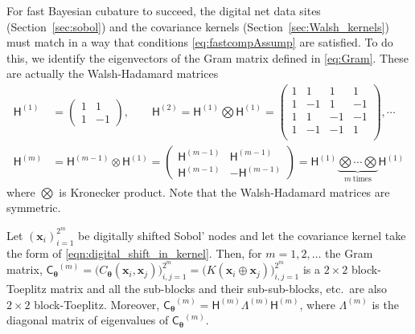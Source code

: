 \documentclass[graybox,footinfo]{svmult}
\newcommand{\bm}[1]{\boldsymbol{#1}}
\newcommand{\vtheta}{{\bm{\theta}}}
\newcommand{\vx}{\bm{x}}
\newcommand{\ai}{\overrightarrow{\imath}}
\newcommand{\aj}{\overrightarrow{\jmath}}
\newcommand{\mCtheta}{{\mathsf{C}_{\vtheta}}}
\newcommand{\mLambda}{\mathsf{\Lambda}}
\newcommand{\mH}{\mathsf{H}}
\newcommand\secref{Section~\ref}
\begin{document}
For fast Bayesian cubature to succeed, the digital net data sites (\secref{sec:sobol}) and the covariance kernels (\secref{sec:Walsh_kernels}) must match in a way that conditions \eqref{eq:fastcompAssump} are satisfied.  To do this, we identify the eigenvectors of the Gram matrix defined in \eqref{eq:Gram}.  These are actually the Walsh-Hadamard matrices
\begin{align}
\nonumber
\mH^{(1)} &=
\begin{pmatrix}
1 & 1 \\ 1 & -1
\end{pmatrix}, \qquad
\mH^{(2)} = \mH^{(1)} \bigotimes \mH^{(1)} = 
\begin{pmatrix}
1 & 1 & 1 & 1 \\ 
1 & -1 & 1 & -1 \\
1 & 1 & -1 & -1 \\ 
1 & -1 & -1 & 1 \\
\end{pmatrix}, \cdots
\\
\label{eqn:hadamard_matrix}
\mH^{(m)} &= \mH^{(m-1)} \otimes \mH^{(1)} =
\begin{pmatrix}
\mH^{(m-1)} & \mH^{(m-1)} \\ \mH^{(m-1)} & -\mH^{(m-1)}
\end{pmatrix} 
= \mH^{(1)} \underbrace{\bigotimes \cdots \bigotimes}_{m \ \text{times}}  \mH^{(1)} 
\end{align}
where $\bigotimes$ is Kronecker product.
Note that the Walsh-Hadamard matrices are symmetric.

\begin{lemma} \label{lemma:eig}
    Let $\left(\vx_i\right)_{i=1}^{2^m}$ be digitally shifted Sobol' nodes and let the covariance kernel take the form of \eqref{eqn:digital_shift_in_kernel}. Then, for $m = 1, 2, \ldots$ the Gram matrix, $
	\mCtheta^{(m)} = \bigl(C_\vtheta(\vx_i, \vx_j)\bigr)_{i,j=1}^{2^m} = \bigl(K(\vx_i \oplus \vx_j)\bigr)_{i,j=1}^{2^m}$ is a $2\times 2$ block-Toeplitz matrix and all the sub-blocks and their sub-sub-blocks, etc.\ are also $2\times 2$ block-Toeplitz. Moreover, $\mCtheta^{(m)} = \mH^{(m)} \mLambda^{(m)}\mH^{(m)}$, where $\mLambda^{(m)}$ is the diagonal matrix of eigenvalues of $\mCtheta^{(m)}$.
\end{lemma}
\end{document}

